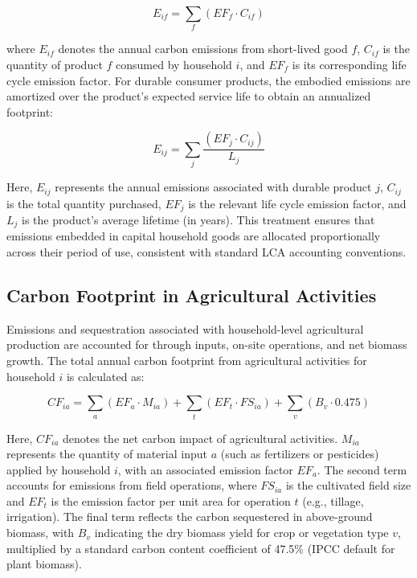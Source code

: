 \documentclass[12pt,a4paper]{article}%
\begin{document}
\begin{equation}
E_{if} = \sum_f (EF_f \cdot C_{if})
\end{equation}

where $E_{if}$ denotes the annual carbon emissions from short-lived good $f$, $C_{if}$ is the quantity of product $f$ consumed by household $i$, and $EF_f$ is its corresponding life cycle emission factor. For durable consumer products, the embodied emissions are amortized over the product's expected service life to obtain an annualized footprint:

\begin{equation}
E_{ij} = \sum_j \frac{(EF_j \cdot C_{ij})}{L_j}
\end{equation}

Here, $E_{ij}$ represents the annual emissions associated with durable product $j$, $C_{ij}$ is the total quantity purchased, $EF_j$ is the relevant life cycle emission factor, and $L_j$ is the product’s average lifetime (in years). This treatment ensures that emissions embedded in capital household goods are allocated proportionally across their period of use, consistent with standard LCA accounting conventions.


\subsection{Carbon Footprint in Agricultural Activities}

Emissions and sequestration associated with household-level agricultural production are accounted for through inputs, on-site operations, and net biomass growth. The total annual carbon footprint from agricultural activities for household $i$ is calculated as:

\begin{equation}
CF_{ia} = \sum_a (EF_a \cdot M_{ia}) + \sum_t (EF_t \cdot FS_{ia}) + \sum_v (B_v \cdot 0.475)
\end{equation}

Here, $CF_{ia}$ denotes the net carbon impact of agricultural activities. $M_{ia}$ represents the quantity of material input $a$ (such as fertilizers or pesticides) applied by household $i$, with an associated emission factor $EF_a$. The second term accounts for emissions from field operations, where $FS_{ia}$ is the cultivated field size and $EF_t$ is the emission factor per unit area for operation $t$ (e.g., tillage, irrigation). The final term reflects the carbon sequestered in above-ground biomass, with $B_v$ indicating the dry biomass yield for crop or vegetation type $v$, multiplied by a standard carbon content coefficient of 47.5\% (IPCC default for plant biomass).
\end{document}
